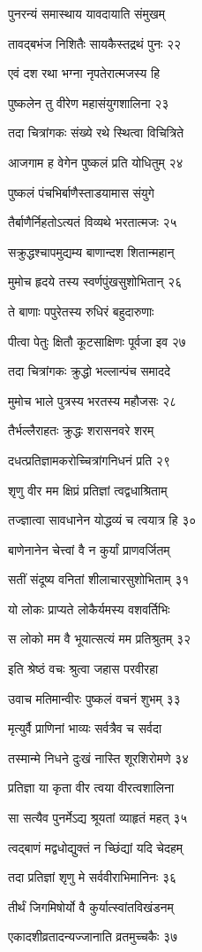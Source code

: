 पुनरन्यं समास्थाय यावदायाति संमुखम्

तावद्बभंज निशितैः सायकैस्तद्रथं पुनः २२

एवं दश रथा भग्ना नृपतेरात्मजस्य हि

पुष्कलेन तु वीरेण महासंयुगशालिना २३

तदा चित्रांगकः संख्ये रथे स्थित्वा विचित्रिते

आजगाम ह वेगेन पुष्कलं प्रति योधितुम् २४

पुष्कलं पंचभिर्बाणैस्ताडयामास संयुगे

तैर्बाणैर्निहतोऽत्यतं विव्यथे भरतात्मजः २५

सक्रुद्धश्चापमुद्यम्य बाणान्दश शितान्महान्

मुमोच हृदये तस्य स्वर्णपुंखसुशोभितान् २६

ते बाणाः पपुरेतस्य रुधिरं बहुदारुणाः

पीत्वा पेतुः क्षितौ कूटसाक्षिणः पूर्वजा इव २७

तदा चित्रांगकः क्रुद्धो भल्लान्पंच समाददे

मुमोच भाले पुत्रस्य भरतस्य महौजसः २८

तैर्भल्लैराहतः क्रुद्धः शरासनवरे शरम्

दधत्प्रतिज्ञामकरोच्चित्रांगनिधनं प्रति २९

शृणु वीर मम क्षिप्रं प्रतिज्ञां त्वद्वधाश्रिताम्

तज्ज्ञात्वा सावधानेन योद्धव्यं च त्वयात्र हि ३०

बाणेनानेन चेत्त्वां वै न कुर्यां प्राणवर्जितम्

सतीं संदूष्य वनितां शीलाचारसुशोभिताम् ३१

यो लोकः प्राप्यते लोकैर्यमस्य वशवर्तिभिः

स लोको मम वै भूयात्सत्यं मम प्रतिश्रुतम् ३२

इति श्रेष्ठं वचः श्रुत्वा जहास परवीरहा

उवाच मतिमान्वीरः पुष्कलं वचनं शुभम् ३३

मृत्युर्वै प्राणिनां भाव्यः सर्वत्रैव च सर्वदा

तस्मान्मे निधने दुःखं नास्ति शूरशिरोमणे ३४

प्रतिज्ञा या कृता वीर त्वया वीरत्वशालिना

सा सत्यैव पुनर्मेऽद्य श्रूयतां व्याहृतं महत् ३५

त्वद्बाणं मद्वधोद्युक्तं न च्छिंद्यां यदि चेदहम्

तदा प्रतिज्ञां शृणु मे सर्ववीराभिमानिनः ३६

तीर्थं जिगमिषोर्यो वै कुर्यात्स्वांतविखंडनम्

एकादशीव्रतादन्यज्जानाति व्रतमुच्चकैः ३७

